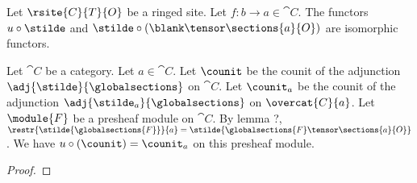 \begin{lemma}
Let $\rsite{C}{T}{O}$ be a ringed site.
Let $f:b \rightarrow a \in \cat{C}$.
The functors $u \circ \stilde$ 
and $\stilde \circ (\blank \tensor \sections{a}{O})$ are isomorphic functors.
\end{lemma}

\begin{lemma}
Let $\cat{C}$ be a category.
Let $a\in \cat{C}$.
Let $\counit$ be the counit of the adjunction $\adj{\stilde}{\globalsections}$ on $\cat{C}$.
Let $\counit_a$ be the counit of the adjunction $\adj{\stilde_a}{\globalsections}$ on $\overcat{C}{a}$.
Let $\module{F}$ be a presheaf module on $\cat{C}$.
By lemma ?, $\restr{\stilde{\globalsections{F}}}{a} = \stilde{\globalsections{F} \tensor \sections{a}{O}}$.
We have $u\circ(\counit) = \counit_a$ on this presheaf module. 
\end{lemma}

\begin{proof}
\end{proof}